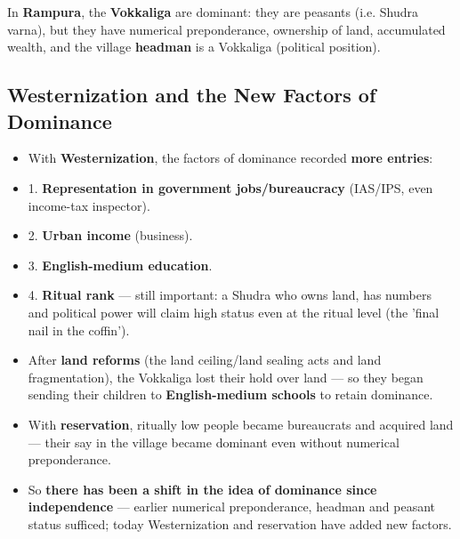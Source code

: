 \begin{ExampleBox}
In \textbf{Rampura}, the \textbf{Vokkaliga} are dominant: they are peasants (i.e. Shudra varna), but they have numerical preponderance, ownership of land, accumulated wealth, and the village \textbf{headman} is a Vokkaliga (political position).
\end{ExampleBox}

\subsection{Westernization and the New Factors of Dominance}

\begin{KeyConcept}
\begin{itemize}
\item With \textbf{Westernization}, the factors of dominance recorded \textbf{more entries}:
\item 1. \textbf{Representation in government jobs/bureaucracy} (IAS/IPS, even income-tax inspector).
\item 2. \textbf{Urban income} (business).
\item 3. \textbf{English-medium education}.
\item 4. \textbf{Ritual rank} --- still important: a Shudra who owns land, has numbers and political power will claim high status even at the ritual level (the 'final nail in the coffin').
\end{itemize}
\end{KeyConcept}

\begin{ExampleBox}
\begin{itemize}
\item After \textbf{land reforms} (the land ceiling/land sealing acts and land fragmentation), the Vokkaliga lost their hold over land --- so they began sending their children to \textbf{English-medium schools} to retain dominance.
\item With \textbf{reservation}, ritually low people became bureaucrats and acquired land --- their say in the village became dominant even without numerical preponderance.
\item So \textbf{there has been a shift in the idea of dominance since independence} --- earlier numerical preponderance, headman and peasant status sufficed; today Westernization and reservation have added new factors.
\end{itemize}
\end{ExampleBox}

